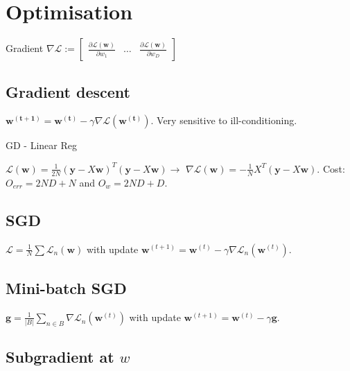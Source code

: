 \section{Optimisation}
Gradient $\nabla \mathcal{L} := \begin{bmatrix} \frac{\partial \mathcal{L}(\mathbf{w})}{\partial w_1} & \dots & \frac{\partial \mathcal{L}(\mathbf{w})}{\partial w_D} \end{bmatrix}$

\subsection{Gradient descent}

$\mathbf{w^{(t+1)}} = \mathbf{w^{(t)}} - \gamma \nabla \mathcal{L}(\mathbf{w^{(t)}})$. Very sensitive to ill-conditioning.

GD - Linear Reg

$\mathcal{L}(\mathbf{w}) = \frac{1}{2N} (\mathbf{y} - X\mathbf{w})^T(\mathbf{y} - X\mathbf{w}) \rightarrow$ \newline $ \nabla \mathcal{L}(\mathbf{w}) = - \frac{1}{N} X^T(\mathbf{y} - X\mathbf{w})$. Cost: \newline $O_{err} = 2ND + N$ and $O_{w} = 2ND + D$.

\subsection{SGD}

$\mathcal{L} = \frac{1}{N} \sum{\mathcal{L}}_n(\mathbf{w})$ with update \newline $\mathbf{w}^{(t+1)} = \mathbf{w}^{(t)} - \gamma \nabla \mathcal{L}_n(\mathbf{w}^{(t)})$.

\subsection{Mini-batch SGD}

$\mathbf{g} = \frac{1}{|B|} \sum_{n\in B}{\nabla \mathcal{L}}_n(\mathbf{w}^{(t)})$ with update \newline $\mathbf{w}^{(t+1)} = \mathbf{w}^{(t)} - \gamma \mathbf{g}$.

\subsection{Subgradient at $w$}

